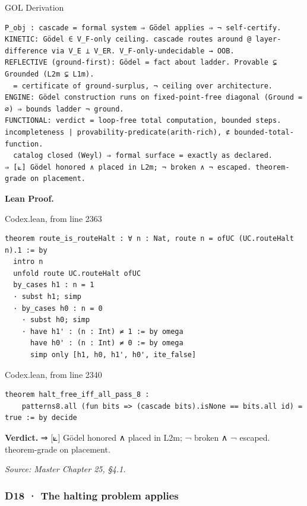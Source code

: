 \documentclass[10pt,twocolumn]{article}
\begin{document}
\begin{golbox}{GOL Derivation}
\begin{lstlisting}[style=golv]
P_obj : cascade = formal system ⇒ Gödel applies ⇒ ¬ self-certify.
KINETIC: Gödel ∈ V_F-only ceiling. cascade routes around @ layer-difference via V_E ⊥ V_ER. V_F-only-undecidable → OOB.
REFLECTIVE (ground-first): Gödel = fact about ladder. Provable ⊊ Grounded (L2m ⊊ L1m).
  = certificate of ground-surplus, ¬ ceiling over architecture.
ENGINE: Gödel construction runs on fixed-point-free diagonal (Ground = ∅) ⇒ bounds ladder ¬ ground.
FUNCTIONAL: verdict = loop-free total computation, bounded steps. incompleteness | provability-predicate(arith-rich), ⊄ bounded-total-function.
  catalog closed (Weyl) ⇒ formal surface = exactly as declared.
⇒ [⟀] Gödel honored ∧ placed in L2m; ¬ broken ∧ ¬ escaped. theorem-grade on placement.
\end{lstlisting}
\end{golbox}

\textbf{Lean Proof.}

\begin{leanexcerpt}{Codex.lean, from line 2363}
\begin{lstlisting}[style=leanx,firstnumber=2363]
theorem route_is_routeHalt : ∀ n : Nat, route n = ofUC (UC.routeHalt n).1 := by
  intro n
  unfold route UC.routeHalt ofUC
  by_cases h1 : n = 1
  · subst h1; simp
  · by_cases h0 : n = 0
    · subst h0; simp
    · have h1' : (n : Int) ≠ 1 := by omega
      have h0' : (n : Int) ≠ 0 := by omega
      simp only [h1, h0, h1', h0', ite_false]
\end{lstlisting}
\end{leanexcerpt}

\begin{leanexcerpt}{Codex.lean, from line 2340}
\begin{lstlisting}[style=leanx,firstnumber=2340]
theorem halt_free_iff_all_pass_8 :
    patterns8.all (fun bits => (cascade bits).isNone == bits.all id) = true := by decide
\end{lstlisting}
\end{leanexcerpt}

\textbf{Verdict.} ⇒ {[}⟀{]} Gödel honored ∧ placed in L2m; ¬ broken ∧ ¬
escaped. theorem-grade on placement.

\emph{Source: Master Chapter 25, §4.1.}

\hypertarget{d18-the-halting-problem-applies}{%
\subsubsection{D18 · The halting problem
applies}\label{d18-the-halting-problem-applies}}
\end{document}
